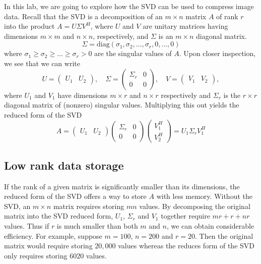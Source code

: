 
\label{lab:SVD}

In this lab, we are going to explore how the SVD can be used to compress image data.
Recall that the SVD is a decomposition of an $m \times n$ matrix $A$ of rank $r$ into the product $A = U \Sigma V^H$, where $U$ and $V$ are unitary matrices having dimensions $m \times m$ and $n \times n$, respectively, and $\Sigma$ is an $m \times n$ diagonal matrix.
\begin{equation*}
\Sigma = \mbox{diag}(\sigma_1,\sigma_2,\ldots,\sigma_r,0,\ldots,0)
\end{equation*}
where $\sigma_1 \geq \sigma_2 \geq \ldots \geq \sigma_r > 0$ are the singular values of $A$.
Upon closer inspection, we see that we can write
\begin{equation*}
U = \begin{pmatrix}U_1 & U_2\end{pmatrix}, \quad \Sigma =
\begin{pmatrix}\Sigma_r & 0\\0 & 0\end{pmatrix}, \quad V =
\begin{pmatrix}V_1 & V_2\end{pmatrix},
\end{equation*}
where $U_1$ and $V_1$ have dimensions $m\times r$ and $n\times r$ respectively and $\Sigma_r$ is the $r\times r$ diagonal matrix of (nonzero) singular values.
Multiplying this out yields the reduced form of the SVD
\begin{equation*}
A =
\begin{pmatrix}U_1 & U_2\end{pmatrix}
\begin{pmatrix}\Sigma_r & 0\\0 & 0\end{pmatrix}
\begin{pmatrix}V^H_1 \\ V^H_2\end{pmatrix} =
U_1 \Sigma_r V_1^H
\end{equation*}

\subsection*{Low rank data storage}
If the rank of a given matrix is significantly smaller than its dimensions, the reduced form of the SVD offers a way to store $A$ with less memory.
Without the SVD, an $m\times n$ matrix requires storing $mn$ values.
By decomposing the original matrix into the SVD reduced form, $U_1$, $\Sigma_r$ and $V_1$ together require $mr+r+nr$ values.
Thus if $r$ is much smaller than both $m$ and $n$, we can obtain considerable efficiency.
For example, suppose $m=100$, $n=200$ and $r=20$.
Then the original matrix would require storing $20,000$ values whereas the reduces form of the SVD only requires storing $6020$ values.

